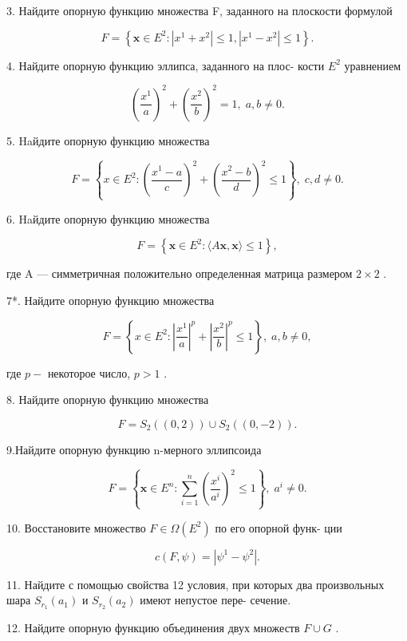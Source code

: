 \documentclass[8pt]{extarticle}
\begin{document}
3. Найдите опорную функцию множества F, заданного на плоскости формулой

\[
F = \left\{  {\mathbf{x} \in  {E}^{2} : \left| {{x}^{1} + {x}^{2}}\right|  \leq  1,\left| {{x}^{1} - {x}^{2}}\right|  \leq  1}\right\}  .
\]

4. Найдите опорную функцию эллипса, заданного на плос- кости \({E}^{2}\) уравнением

\[
{\left( \frac{{x}^{1}}{a}\right) }^{2} + {\left( \frac{{x}^{2}}{b}\right) }^{2} = 1,\;a,b \neq  0.
\]

5. Haйдите опорную функцию множества

\[
F = \left\{  {x \in  {E}^{2} : {\left( \frac{{x}^{1} - a}{c}\right) }^{2} + {\left( \frac{{x}^{2} - b}{d}\right) }^{2} \leq  1}\right\}  ,\;c,d \neq  0.
\]

6. Haйдите опорную функцию множества

\[
F = \left\{  {\mathbf{x} \in  {E}^{2} : \langle A\mathbf{x},\mathbf{x}\rangle  \leq  1}\right\}  ,
\]

где A — симметричная положительно определенная матрица размером \(2 \times  2\) .

7*. Найдите опорную функцию множества

\[
F = \left\{  {x \in  {E}^{2} : {\left| \frac{{x}^{1}}{a}\right| }^{p} + {\left| \frac{{x}^{2}}{b}\right| }^{p} \leq  1}\right\}  ,\;a,b \neq  0,
\]

где \(p -\) некоторое число, \(p > 1\) .

8. Найдите опорную функцию множества

\[
F = {S}_{2}\left( \left( {0,2}\right) \right)  \cup  {S}_{2}\left( \left( {0, - 2}\right) \right) .
\]

9.Найдите опорную функцию n-мерного эллипсоида

\[
F = \left\{  {\mathbf{x} \in  {E}^{n} : \mathop{\sum }\limits_{{i = 1}}^{n}{\left( \frac{{x}^{i}}{{a}^{i}}\right) }^{2} \leq  1}\right\}  ,\;{a}^{i} \neq  0.
\]

10. Восстановите множество \(F \in  \Omega \left( {E}^{2}\right)\) по его опорной функ- ции

\[
c\left( {F,\psi }\right)  = \left| {{\psi }^{1} - {\psi }^{2}}\right| .
\]

11. Найдите с помощью свойства 12 условия, при которых два произвольных шара \({S}_{{r}_{1}}\left( {a}_{1}\right)\) и \({S}_{{r}_{2}}\left( {a}_{2}\right)\) имеют непустое пере- сечение.

12. Найдите опорную функцию объединения двух множеств \(F \cup  G\) .
\end{document}
